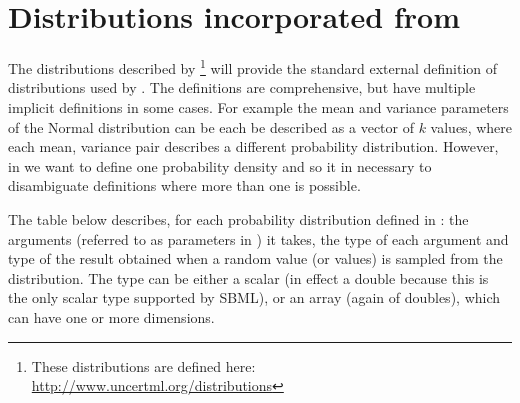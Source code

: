 \documentclass[draftspec]{sbmlpkgspec}
\begin{document}
\appendix
\section{Distributions incorporated from \uncertml}
\label{sec:uncertmlusage}

The distributions described by \uncertml \footnote{These
  distributions are defined here:
  \url{http://www.uncertml.org/distributions}} will provide the
standard external definition of distributions used by \distrib. The
definitions are comprehensive, but have multiple implicit definitions
in some cases. For example the mean and variance parameters of the
Normal distribution can be each be described as a vector of $k$
values, where each mean, variance pair describes a different
probability distribution. However, in \distribshort we want to define
one probability density and so it in necessary to disambiguate
definitions where more than one is possible.

The table below describes, for each probability distribution defined in
\uncertml: the arguments (referred to as parameters in \uncertml) it
takes, the type of each argument and type of the result obtained when
a random value (or values) is sampled from the distribution. The type
can be either a scalar (in effect a double because this is the only
scalar type supported by SBML), or an array (again of doubles), which
can have one or more dimensions.
\end{document}
